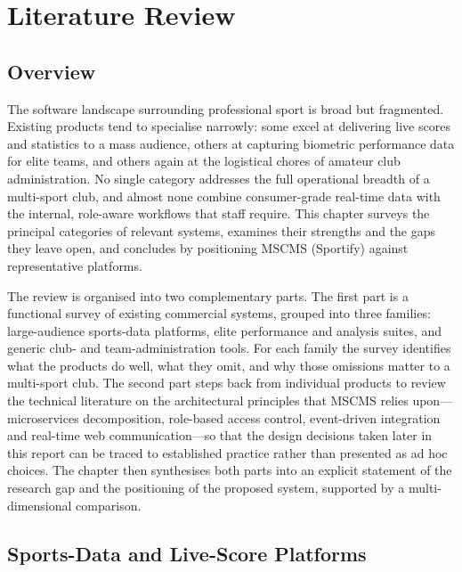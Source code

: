 \chapter{Literature Review}
\label{ch:literature}

\section{Overview}
\label{sec:lit-overview}

The software landscape surrounding professional sport is broad but fragmented. Existing
products tend to specialise narrowly: some excel at delivering live scores and statistics to a
mass audience, others at capturing biometric performance data for elite teams, and others
again at the logistical chores of amateur club administration. No single category addresses
the full operational breadth of a multi-sport club, and almost none combine consumer-grade
real-time data with the internal, role-aware workflows that staff require. This chapter
surveys the principal categories of relevant systems, examines their strengths and the gaps
they leave open, and concludes by positioning MSCMS (Sportify) against representative
platforms.

The review is organised into two complementary parts. The first part is a functional survey
of existing commercial systems, grouped into three families: large-audience sports-data
platforms, elite performance and analysis suites, and generic club- and team-administration
tools. For each family the survey identifies what the products do well, what they omit, and
why those omissions matter to a multi-sport club. The second part steps back from individual
products to review the technical literature on the architectural principles that MSCMS
relies upon---microservices decomposition, role-based access control, event-driven
integration and real-time web communication---so that the design decisions taken later in
this report can be traced to established practice rather than presented as ad hoc choices.
The chapter then synthesises both parts into an explicit statement of the research gap and
the positioning of the proposed system, supported by a multi-dimensional comparison.

\section{Sports-Data and Live-Score Platforms}
\label{sec:lit-data}

